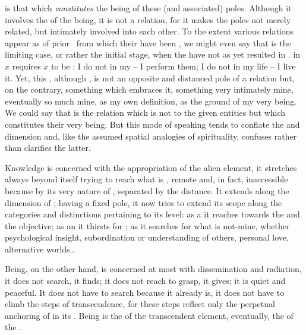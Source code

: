 is that which {\em constitutes} the being of these
 (and associated) poles. Although
it involves the  of the  being, it is not a
relation, for it makes the poles not merely related, but intimately involved
into each other. To the extent various relations appear as  of prior
\nexuss\ from which their  have been , we might even
say that  is the limiting case, or rather the initial stage, when
the  have not as yet resulted in
.  in $x$ requires $x$ to be : I do not  in my  -- I perform them; I do not
 in 
my life -- I live it. Yet, this , although ,
is not an opposite and distanced pole of a relation but, on the contrary,
something which embraces it, something very intimately mine,
eventually so much mine, as my own definition, as the ground of my very
being. We could say that  is the relation
which is not  to the given entities but which constitutes their very
being. But this mode of speaking tends to conflate the  and
 dimension and, like the assumed spatial analogies of
spirituality, confuses rather than clarifies the latter. 

Knowledge is concerned with the appropriation of the alien element, it stretches
always beyond itself trying to reach what is , remote and, in fact, 
inaccessible because by its very nature of , separated by the
distance.  It extends 
along the  dimension of ; having a fixed
 pole, it now tries to extend its scope along the categories and
distinctions pertaining to its level: as a  it reaches towards the
 and the objective; as an  it thirsts for ; as
 it searches for what is not-mine, whether psychological insight,
subordination or understanding of others, personal love, alternative worlds\ldots

Being, on the other hand, is concerned at most with dissemination and radiation,
it does not search, it finds; it does not reach to grasp, it gives; it is quiet
and peaceful. It does not have to 
search because it already is, it does not have to climb the  steps
of transcendence, for these steps reflect only the perpetual anchoring of
 in its .  Being is the  of the
 transcendent element, eventually, the  of the
.

